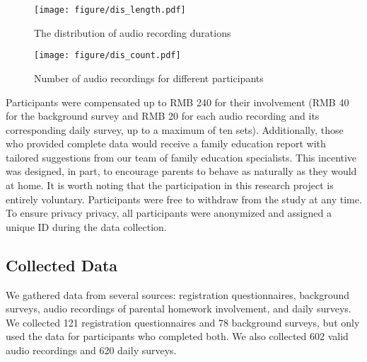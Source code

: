 \begin{figure}
    \centering
    \begin{minipage}[t][6cm]{0.45\textwidth}
        \texttt{[image: figure/dis\_length.pdf]}
        \caption{The distribution of audio recording durations}
        \label{fig:dis_length}
    \end{minipage}
    \hspace{0.2cm}
    \begin{minipage}[t][6cm]{0.45\textwidth}
    \centering
        \texttt{[image: figure/dis\_count.pdf]}
        \caption{Number of audio recordings for different participants}
        \label{fig:dis_count}
    \end{minipage}
    
\end{figure}
Participants were compensated up to RMB 240 for their involvement (RMB 40 for the background survey and RMB 20 for each audio recording and its corresponding daily survey, up to a maximum of ten sets). Additionally, those who provided complete data would receive a family education report with tailored suggestions from our team of family education specialists. This incentive was designed, in part, to encourage parents to behave as naturally as they would at home. It is worth noting that the participation in this research project is entirely voluntary. Participants were free to withdraw from the study at any time. To ensure privacy privacy, all participants were anonymized and assigned a unique ID during the data collection.






\subsection{Collected Data}

We gathered data from several sources: registration questionnaires, background surveys, audio recordings of parental homework involvement, and daily surveys. We collected 121 registration questionnaires and 78 background surveys, but only used the data for participants who completed both. We also collected 602 valid audio recordings and 620 daily surveys. 

